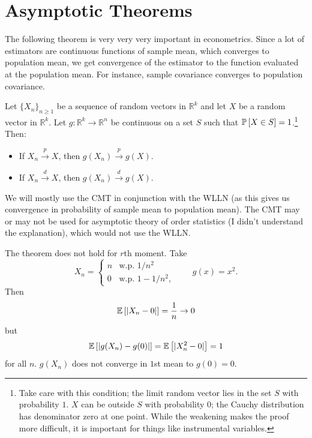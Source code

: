 \section{Asymptotic Theorems}

The following theorem is very very very important in econometrics. Since a lot of estimators are continuous functions of sample mean, which converges to population mean, we get convergence of the estimator to the function evaluated at the population mean. For instance, sample covariance converges to population covariance.

\begin{theorem}
	Let $\{X_n\}_{n\ge 1}$ be a sequence of random vectors in $\mathbb{R}^k$ and let $X$ be a random vector in $\mathbb{R}^k$. Let $g:\mathbb{R}^k\to\mathbb{R}^n$ be continuous on a set $S$ such that $\P\left[X\in S\right]=1$.\footnote{Take care with this condition; the limit random vector lies in the set $S$ with probability $1$. $X$ can be outside $S$ with probability $0$; the Cauchy distribution has denominator zero at one point. While the weakening makes the proof more difficult, it is important for things like instrumental variables.} Then:
	\begin{itemize}
		\item If $X_n\xrightarrow{p}X$, then $g(X_n)\xrightarrow{p}g(X)$.
		\item If $X_n\xrightarrow{d}X$, then $g(X_n)\xrightarrow{d}g(X)$.
	\end{itemize}
\end{theorem}

We will mostly use the CMT in conjunction with the WLLN (as this gives us convergence in probability of sample mean to population mean). The CMT may or may not be used for asymptotic theory of order statistics (I didn't understand the explanation), which would not use the WLLN.

\begin{remark}	The theorem does not hold for $r$th moment. Take
	\[
		X_n=\begin{cases}
			n & \text{w.p. }1/n^2    \\
			0 & \text{w.p. }1-1/n^2,
		\end{cases}
		\qquad g(x)=x^2.
	\]
	Then
	\[
		\E\left[|X_n-0|\right]=\frac{1}{n}\to 0
	\]
	but
	\[
		\E\left[|g(X_n)-g(0)|\right]=\E\left[|X_n^2-0|\right]=1
	\]
	for all $n$. $g(X_n)$ does not converge in $1$st mean to $g\left(0 \right) =0 $.
\end{remark}

